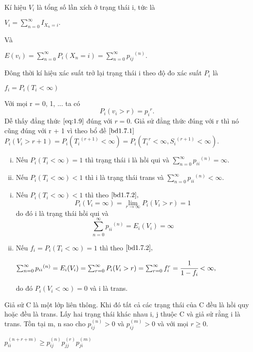 Kí hiệu $V_i$ là tổng số lần xích ở trạng thái i, tức là
\begin{center}
$V_i = \displaystyle\sum_{n=0}^{\infty} I_{X_n=i}.$
\end{center}
Và 
\begin{center}
$E(v_i) = \displaystyle\sum_{n=0}^{\infty}{P_i(X_n=i)} = \displaystyle\sum_{n=0}^{\infty}{{p_{ij}}^{(n)}}.$
\end{center}
Đông thời kí hiệu xác suất trở lại trạng thái i theo độ đo xác suất $P_i$ là
\begin{center}
$f_i = P_i(T_i < \infty)$
\end{center}
\bd\label{bd1.7.2}
Với mọi r = 0, 1, ... ta có
\begin{equation}\label{eq:1.9}
P_i(v_i > r) = {p_i}^{r}.
\end{equation}
\hbd
\cm
Dễ thấy đẳng thức $\eqref{eq:1.9}$ đúng với $r=0$. Giả sử đẳng thức đúng với r thì nó cũng đúng với r + 1 vì theo bổ đề $\eqref{bd1.7.1}$ \\
$P_i(V_i> r+1) = P_i({T_i}^{(r+1)} < \infty) = P_i({T_i}^{r} < \infty, {S_i}^{(r+1)} < \infty).$

\dl\label{dl1.7.3}
\begin{enumerate}[i)]
\item Nếu $P_i(T_i < \infty) = 1$ thì trạng thái i là hồi qui và $\displaystyle\sum_{n=0}^{\infty}{{p_{ii}}^{(n)}} = \infty.$
\item Nếu $P_i(T_i < \infty) <1$ thì i là trạng thái trans và $\displaystyle\sum_{n=0}^{\infty}{{p_{ii}}^{(n)}} < \infty.$
\end{enumerate}
\hdl
\cm
\begin{enumerate}[i)]
\item Nếu  $P_i(T_i < \infty) <1$ thì theo $\eqref{bd1.7.2},$
\[ P_i(V_i=\infty) = \lim_{r\to\infty} {P_i(V_i > r)} = 1\]
do đó i là trạng thái hồi qui và
\[\sum_{n=0}^{\infty}{{p_{ii}}^{(n)}} = E_i(V_i) = \infty\]
\item Nếu $f_i = P_i(T_i < \infty) = 1$ thì theo $\eqref{bd1.7.2},$ 
\begin{center}
$\sum_{n=0}^{\infty}{{p_{ii}}^{(n)}} = E_i(V_i) = \sum_{r=0}^{\infty}{P_i(V_i > r)} = \sum_{r=0}^{\infty}{f_i^r}= \cfrac{1}{1-f_i} < \infty,$
\end{center} 
do đó $P_i(V_i < \infty)=0$ và i là trans.
\end{enumerate}


\dl\label{dl1.7.4}
	Giả sử C là một lớp liên thông. Khi đó tất cả các 		trạng thái của C đều là hồi quy hoặc đều là trans.
\hdl
\cm
	Lấy hai trạng thái khác nhau i, j thuộc C và giả sử rằng i là trans. Tồn tại m, n sao cho $p_{ij}^{(n)} > 0$ và $p_{ij}^{(m)} > 0$ và với mọi $r \geq 0$.\\
	\begin{center}
	$p_{ii}^{(n+r+m)} \geq p_{ij}^{(n)}p_{jj}^{(r)}p_{ji}^{(m)}$ \\
	\end{center}
	
